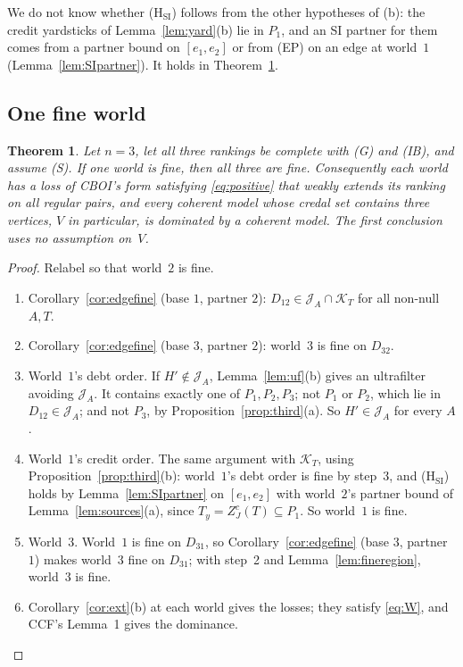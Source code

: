 \documentclass[11pt]{article}
\newtheorem{theorem}{Theorem}
\theoremstyle{definition}\newtheorem{definition}[theorem]{Definition}
\theoremstyle{remark}\newtheorem{remark}[theorem]{Remark}
\newcommand{\Jid}{\mathcal J}
\newcommand{\Kid}{\mathcal K}
\begin{document}
We do not know whether (H$_{\mathrm{SI}}$) follows from the other
hypotheses of (b): the credit yardsticks of Lemma~\ref{lem:yard}(b) lie in $P_1$, and an SI
partner for them comes from a partner bound on $[e_1,e_2]$ or from (EP) on an
edge at world~$1$ (Lemma~\ref{lem:SIpartner}). It holds in
Theorem~\ref{thm:onefine}.

\subsection{One fine world}

\begin{theorem}\label{thm:onefine}
Let $n=3$, let all three rankings be complete with (G) and (IB), and assume
(S). If one world is fine, then all three are fine. Consequently each world
has a loss of CBOI's form satisfying \eqref{eq:positive} that weakly extends
its ranking on all regular pairs, and every coherent model whose credal set
contains three vertices, $V$ in particular, is dominated by a coherent
model. The first conclusion uses no assumption on~$V$.
\end{theorem}
\begin{proof}
Relabel so that world~$2$ is fine.
\begin{enumerate}[label=\arabic*.,leftmargin=*,itemsep=1pt]
\item Corollary~\ref{cor:edgefine} (base $1$, partner $2$):
$D_{12}\in\Jid_A\cap\Kid_T$ for all non-null $A,T$.
\item Corollary~\ref{cor:edgefine} (base $3$, partner $2$): world~$3$ is
fine on $D_{32}$.
\item World~$1$'s debt order. If $H'\notin\Jid_A$, Lemma~\ref{lem:uf}(b)
gives an ultrafilter avoiding $\Jid_A$. It contains exactly one of
$P_1,P_2,P_3$; not $P_1$ or $P_2$, which lie in $D_{12}\in\Jid_A$; and not
$P_3$, by Proposition~\ref{prop:third}(a). So $H'\in\Jid_A$ for every $A$.
\item World~$1$'s credit order. The same argument with $\Kid_T$, using
Proposition~\ref{prop:third}(b): world~$1$'s debt order is fine by step~3,
and (H$_{\mathrm{SI}}$) holds by Lemma~\ref{lem:SIpartner} on $[e_1,e_2]$
with world~$2$'s partner bound of Lemma~\ref{lem:sources}(a), since
$T_y=Z^c_J(T)\subseteq P_1$. So world~$1$ is fine.
\item World~$3$. World~$1$ is fine on $D_{31}$, so
Corollary~\ref{cor:edgefine} (base $3$, partner $1$) makes world~$3$ fine on
$D_{31}$; with step~2 and Lemma~\ref{lem:fineregion}, world~$3$ is fine.
\item Corollary~\ref{cor:ext}(b) at each world gives the losses; they satisfy
\eqref{eq:W}, and CCF's Lemma~1 gives the dominance.
\end{enumerate}
\end{proof}
\end{document}
